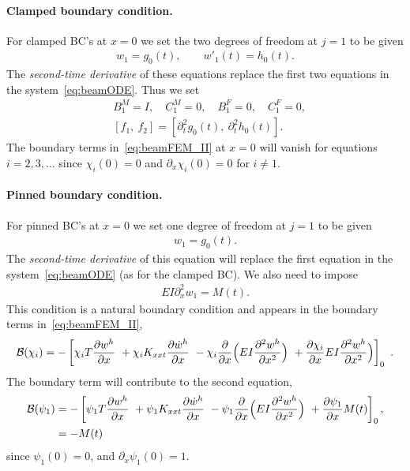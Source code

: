 \documentclass[11pt]{article}
\begin{document}
\paragraph{Clamped boundary condition.} For clamped BC's at $x=0$ we set the two degrees of
freedom at $j=1$ to be given
\begin{align}
  w_1 = g_0(t), \qquad w'_1(t)=h_0(t).
\end{align}
The {\em second-time derivative} of these equations replace the first two equations in the system~\eqref{eq:beamODE}. 
Thus we set 
\begin{align*}
&  B_1^M=I, \quad C_1^M=0, \quad B^F_1=0, \quad C^F_1=0 , \\
&  [f_1, ~f_2]=[\partial_t^2g_0(t), ~\partial_t^2 h_0(t)].
\end{align*}
The boundary terms in~\eqref{eq:beamFEM_II} at $x=0$ will vanish for equations $i=2,3,\ldots$ 
since $\chi_i(0)=0$ and $\partial_x\chi_i(0)=0$
for $i\ne 1$.

\paragraph{Pinned boundary condition.} For pinned BC's at $x=0$ we set one degree of
freedom at $j=1$ to be given
\begin{align}
  w_1 = g_0(t) .
\end{align}
The {\em second-time derivative} of this equation will replace the first equation in the system~\eqref{eq:beamODE} (as for
the clamped BC).  
We also need to impose
\begin{align}
  EI \partial_x^2 w_1 = M(t). 
\end{align}
This condition is a natural boundary condition and appears in the boundary terms in~\eqref{eq:beamFEM_II}, 
\begin{align}
   \mathcal{B}(\chi_i) = -\left[ \chi_i T \frac{\partial w^h}{\partial x} 
                     ~ + \chi_i K_{xxt} \frac{\partial \dot w^h}{\partial x}
                     ~ - \chi_i \frac{\partial}{\partial x}\Big( E I \frac{\partial^2 w^h}{\partial x^2}\Big) 
                      ~ + \frac{\partial \chi_i}{\partial x}E I \frac{\partial^2 w^h}{\partial x^2}\Big)  
                      \right]_0 ~.
\end{align}
The boundary term will contribute to the second equation, 
\begin{align}
   \mathcal{B}(\psi_1) &= -\left[ \psi_1 T \frac{\partial w^h}{\partial x} 
                      ~ + \psi_1 K_{xxt} \frac{\partial \dot w^h}{\partial x}
                      ~ - \psi_1 \frac{\partial}{\partial x}\Big( E I \frac{\partial^2 w^h}{\partial x^2}\Big) 
                      ~ + \frac{\partial \psi_1}{\partial x} M(t)  
                      \right]_0, \\
        &= -M(t) 
\end{align}
since $\psi_1(0)=0$, and $\partial_x\psi_1(0)=1$. 
\end{document}
